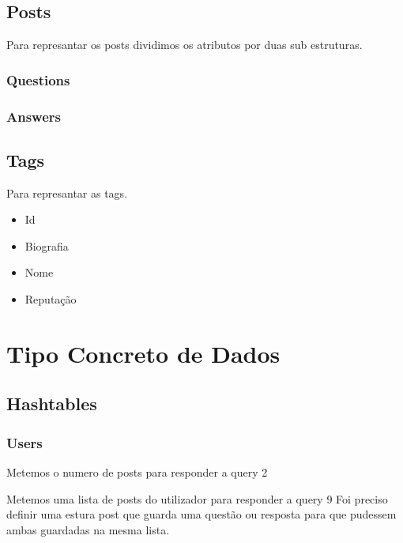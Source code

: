 \documentclass[10pt,a4paper]{report}
\begin{document}
    \section{Posts}
    Para represantar os posts dividimos os atributos por duas sub
    estruturas.
        \subsection{Questions}
        \begin{itemize}
            
        \end{itemize}
        \subsection{Answers}
        \begin{itemize}
            
        \end{itemize}
    \section{Tags}
    Para represantar as tags.
    \begin{itemize}
        \item Id
        \item Biografia
        \item Nome
        \item Reputação
\end{itemize}


\chapter{Tipo Concreto de Dados}

    \section{Hashtables}

        \subsection{Users}
        Metemos o numero de posts para responder a query 2

        Metemos uma lista de posts do utilizador para responder a query 9
        Foi preciso definir uma estura post que guarda uma questão ou resposta para
        que pudessem ambas guardadas na mesma lista.
\end{document}
